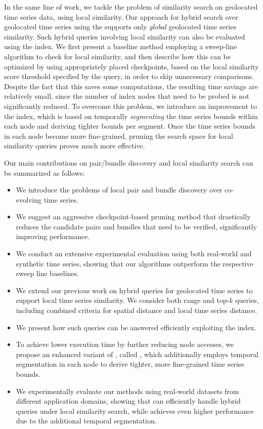 In the same line of work, we tackle the problem of similarity search on geolocated time series data, using local similarity. Our approach for hybrid search over geolocated time series using the \btsr supports only \textit{global} geolocated time series similarity. Such hybrid queries involving local similarity can also be evaluated using the \btsr index. We first present a baseline method employing a sweep-line algorithm to check for local similarity, and then describe how this can be optimized by using appropriately placed checkpoints, based on the local similarity score threshold specified by the query, in order to skip unnecessary comparisons. Despite the fact that this saves some computations, the resulting time savings are relatively small, since the number of index nodes that need to be probed is not significantly reduced. To overcome this problem, we introduce an improvement to the \btsr index, which is based on temporally \textit{segmenting} the time series bounds within each node and deriving tighter bounds per segment. Once the time series bounds in each node become more fine-grained, pruning the search space for local similarity queries proves much more effective.

Our main contributions on pair/bundle discovery and local similarity search can be summarized as follows:

\begin{itemize} 
 \item We introduce the problems of local pair and bundle discovery over co-evolving time series.
 \item We suggest an aggressive checkpoint-based pruning method that drastically reduces the candidate pairs and bundles that need to be verified, significantly improving performance.
 \item We conduct an extensive experimental evaluation using both real-world and synthetic time series, showing that our algorithms outperform the respective sweep line baselines.
 \item We extend our previous work on hybrid queries for geolocated time series to support local time series similarity. We consider both range and top-$k$ queries, including combined criteria for spatial distance and local time series distance.
 \item We present how such queries can be answered efficiently exploiting the \btsr index.
 \item To achieve lower execution time by further reducing node accesses, we propose an enhanced variant of \btsr, called \sbtsr, which additionally employs temporal segmentation in each node to derive tighter, more fine-grained time series bounds.
 \item We experimentally evaluate our methods using real-world datasets from different application domains, showing that \btsr can efficiently handle hybrid queries under local similarity search, while \sbtsr achieves even higher performance due to the additional temporal segmentation.
\end{itemize}

